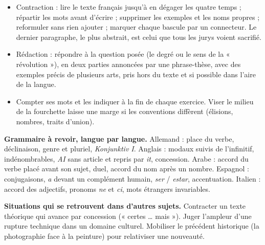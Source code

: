 \documentclass[11pt,a4paper]{article}
\providecommand{\tightlist}{\setlength{\itemsep}{0pt}\setlength{\parskip}{0pt}}
\begin{document}
\begin{itemize}
\tightlist
\item
  Contraction : lire le texte français jusqu'à en dégager les quatre temps ; répartir les mots avant d'écrire ; supprimer les exemples et les noms propres ; reformuler sans rien ajouter ; marquer chaque bascule par un connecteur. Le dernier paragraphe, le plus abstrait, est celui que tous les jurys voient sacrifié.
\item
  Rédaction : répondre à la question posée (le degré ou le sens de la « révolution »), en deux parties annoncées par une phrase-thèse, avec des exemples précis de plusieurs arts, pris hors du texte et si possible dans l'aire de la langue.
\item
  Compter ses mots et les indiquer à la fin de chaque exercice. Viser le milieu de la fourchette laisse une marge si les conventions diffèrent (élisions, nombres, traits d'union).
\end{itemize}

\textbf{Grammaire à revoir, langue par langue.} Allemand : place du verbe, déclinaison, genre et pluriel, \emph{Konjunktiv I}. Anglais : modaux suivis de l'infinitif, indénombrables, \emph{AI} sans article et repris par \emph{it}, concession. Arabe : accord du verbe placé avant son sujet, duel, accord du nom après un nombre. Espagnol : conjugaisons, \emph{a} devant un complément humain, \emph{ser} / \emph{estar}, accentuation. Italien : accord des adjectifs, pronoms \emph{ne} et \emph{ci}, mots étrangers invariables.

\textbf{Situations qui se retrouvent dans d'autres sujets.} Contracter un texte théorique qui avance par concession (« certes \ldots{} mais »). Juger l'ampleur d'une rupture technique dans un domaine culturel. Mobiliser le précédent historique (la photographie face à la peinture) pour relativiser une nouveauté.
\end{document}
